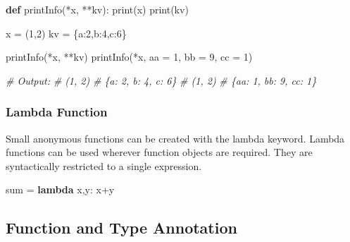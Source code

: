 \documentclass[
]{article}
\newenvironment{Shaded}{}{}
\newcommand{\BuiltInTok}[1]{#1}
\newcommand{\CommentTok}[1]{\textcolor[rgb]{0.38,0.63,0.69}{\textit{#1}}}
\newcommand{\DecValTok}[1]{\textcolor[rgb]{0.25,0.63,0.44}{#1}}
\newcommand{\KeywordTok}[1]{\textcolor[rgb]{0.00,0.44,0.13}{\textbf{#1}}}
\newcommand{\NormalTok}[1]{#1}
\newcommand{\OperatorTok}[1]{\textcolor[rgb]{0.40,0.40,0.40}{#1}}
\newcommand{\StringTok}[1]{\textcolor[rgb]{0.25,0.44,0.63}{#1}}
\begin{document}
\begin{Shaded}
\begin{Highlighting}[]
\KeywordTok{def}\NormalTok{ printInfo(}\OperatorTok{*}\NormalTok{x, }\OperatorTok{**}\NormalTok{kv):}
   \BuiltInTok{print}\NormalTok{(x)}
   \BuiltInTok{print}\NormalTok{(kv)}

\NormalTok{x }\OperatorTok{=}\NormalTok{ (}\DecValTok{1}\NormalTok{,}\DecValTok{2}\NormalTok{) }
\NormalTok{kv }\OperatorTok{=}\NormalTok{ \{}\StringTok{\textquotesingle{}a\textquotesingle{}}\NormalTok{:}\DecValTok{2}\NormalTok{,}\StringTok{\textquotesingle{}b\textquotesingle{}}\NormalTok{:}\DecValTok{4}\NormalTok{,}\StringTok{\textquotesingle{}c\textquotesingle{}}\NormalTok{:}\DecValTok{6}\NormalTok{\}}

\NormalTok{printInfo(}\OperatorTok{*}\NormalTok{x, }\OperatorTok{**}\NormalTok{kv)}
\NormalTok{printInfo(}\OperatorTok{*}\NormalTok{x, aa }\OperatorTok{=} \DecValTok{1}\NormalTok{, bb }\OperatorTok{=} \DecValTok{9}\NormalTok{, cc }\OperatorTok{=} \DecValTok{1}\NormalTok{)}

\CommentTok{\# Output:}
\CommentTok{\# (1, 2)}
\CommentTok{\# \{\textquotesingle{}a\textquotesingle{}: 2, \textquotesingle{}b\textquotesingle{}: 4, \textquotesingle{}c\textquotesingle{}: 6\}}
\CommentTok{\# (1, 2)}
\CommentTok{\# \{\textquotesingle{}aa\textquotesingle{}: 1, \textquotesingle{}bb\textquotesingle{}: 9, \textquotesingle{}cc\textquotesingle{}: 1\}}
\end{Highlighting}
\end{Shaded}

\hypertarget{lambda-function}{%
\subsubsection{Lambda Function}\label{lambda-function}}

Small anonymous functions can be created with the lambda keyword. Lambda
functions can be used wherever function objects are required. They are
syntactically restricted to a single expression.

\begin{Shaded}
\begin{Highlighting}[]
\BuiltInTok{sum} \OperatorTok{=} \KeywordTok{lambda}\NormalTok{ x,y: x}\OperatorTok{+}\NormalTok{y}
\end{Highlighting}
\end{Shaded}

\hypertarget{function-and-type-annotation}{%
\subsection{Function and Type
Annotation}\label{function-and-type-annotation}}
\end{document}
